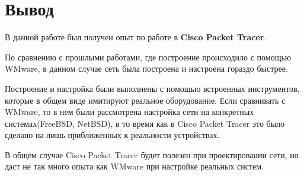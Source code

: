 \documentclass[14pt,a4paper,report]{report}
\begin{document}
\section*{Вывод}
В данной работе был получен опыт по работе в \textbf{Cisco Packet Tracer}.

По сравнению с прошлыми работами, где построение происходило с помощью WMware, в данном случае сеть была построена и настроена гораздо быстрее.

Построение и настройка были выполнены с помощью встроенных инструментов, которые в общем виде имитируют реальное оборудование. Если сравнивать с WMware, то в нем были рассмотрена настройка сети на конкретных системах(FreeBSD, NetBSD), в то время как в Cisco Packet Tracer это было сделано на лишь приближенных к реальности устройствах.

В общем случае Cisco Packet Tracer будет полезен при проектировании сети, но даст не так много опыта как WMware при настройке реальных систем.

%
%
\end{document}

